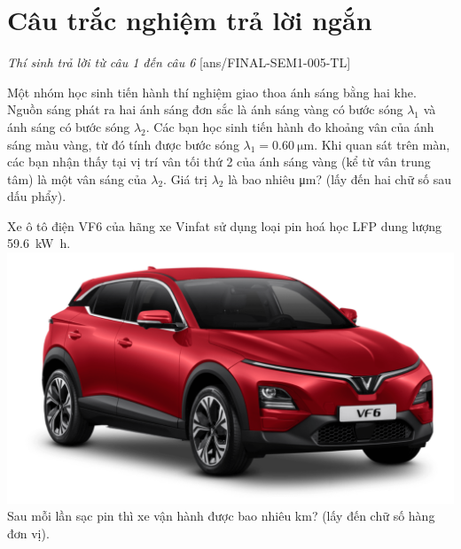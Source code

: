 \section{Câu trắc nghiệm trả lời ngắn} \textit{Thí sinh trả lời từ câu 1 đến câu 6}
\setcounter{ex}{0}
[ans/FINAL-SEM1-005-TL]
\begin{ex}
	Một nhóm học sinh tiến hành thí nghiệm giao thoa ánh sáng bằng hai khe. Nguồn sáng phát ra hai ánh sáng đơn sắc là ánh sáng vàng có bước sóng $\lambda_1$ và ánh sáng có bước sóng $\lambda_2$. Các bạn học sinh tiến hành đo khoảng vân của ánh sáng màu vàng, từ đó tính được bước sóng $\lambda_1=\SI{0.60}{\micro\meter}$. Khi quan sát trên màn, các bạn nhận thấy tại vị trí vân tối thứ 2 của ánh sáng vàng (kể từ vân trung tâm) là một vân sáng của $\lambda_2$. Giá trị $\lambda_2$ là bao nhiêu \si{\micro\meter}? (lấy đến hai chữ số sau dấu phẩy).
\end{ex}
\begin{ex}
	Xe ô tô điện VF6 của hãng xe Vinfat sử dụng loại pin hoá học LFP dung lượng \SI{59.6}{\kilo\watt\hour}. 
{\includegraphics[scale=0.06]{../figs/FINAL-SEM1-005-13}}
Sau mỗi lần sạc pin thì xe vận hành được bao nhiêu \si{\kilo\meter}? (lấy đến chữ số hàng đơn vị).
\end{ex}
